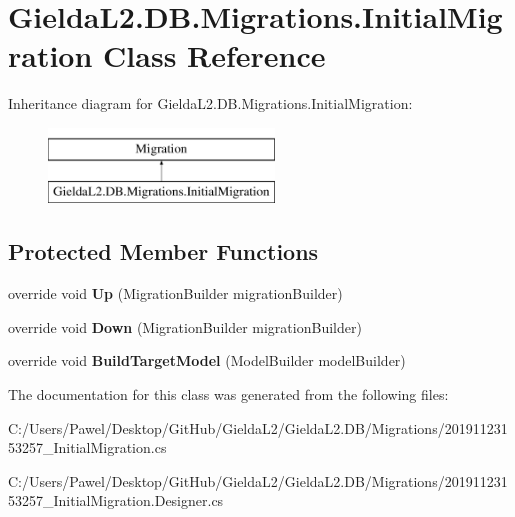 \hypertarget{class_gielda_l2_1_1_d_b_1_1_migrations_1_1_initial_migration}{}\section{Gielda\+L2.\+D\+B.\+Migrations.\+Initial\+Migration Class Reference}
\label{class_gielda_l2_1_1_d_b_1_1_migrations_1_1_initial_migration}
Inheritance diagram for Gielda\+L2.\+D\+B.\+Migrations.\+Initial\+Migration\+:\begin{figure}[H]
\begin{center}
\leavevmode
\includegraphics[height=2.000000cm]{class_gielda_l2_1_1_d_b_1_1_migrations_1_1_initial_migration}
\end{center}
\end{figure}
\subsection*{Protected Member Functions}
\begin{DoxyCompactItemize}
\item 
\mbox{\label{class_gielda_l2_1_1_d_b_1_1_migrations_1_1_initial_migration_ab940f14efa8440ff44edf82407a4a653}} 
override void {\bfseries Up} (Migration\+Builder migration\+Builder)
\item 
\mbox{\label{class_gielda_l2_1_1_d_b_1_1_migrations_1_1_initial_migration_a72ce1940312141971e5553264816a315}} 
override void {\bfseries Down} (Migration\+Builder migration\+Builder)
\item 
\mbox{\label{class_gielda_l2_1_1_d_b_1_1_migrations_1_1_initial_migration_a6295789d48c7de37dc4bee295bb723ea}} 
override void {\bfseries Build\+Target\+Model} (Model\+Builder model\+Builder)
\end{DoxyCompactItemize}


The documentation for this class was generated from the following files\+:\begin{DoxyCompactItemize}
\item 
C\+:/\+Users/\+Pawel/\+Desktop/\+Git\+Hub/\+Gielda\+L2/\+Gielda\+L2.\+D\+B/\+Migrations/20191123153257\+\_\+\+Initial\+Migration.\+cs\item 
C\+:/\+Users/\+Pawel/\+Desktop/\+Git\+Hub/\+Gielda\+L2/\+Gielda\+L2.\+D\+B/\+Migrations/20191123153257\+\_\+\+Initial\+Migration.\+Designer.\+cs\end{DoxyCompactItemize}
